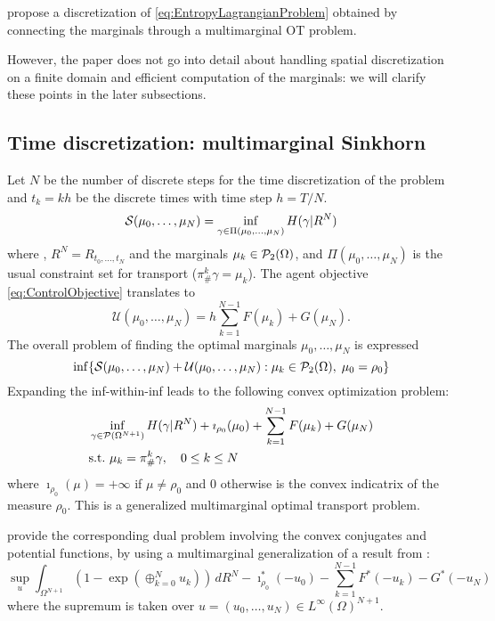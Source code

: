 \documentclass[../report.tex]{subfiles}
\begin{document}
\textcite{benamou2018entropy} propose a discretization of \eqref{eq:EntropyLagrangianProblem} obtained by connecting the marginals through a multimarginal OT problem.

However, the paper does not go into detail about handling spatial discretization on a finite domain and efficient computation of the marginals: we will clarify these points in the later subsections.


\subsection{Time discretization: multimarginal Sinkhorn}\label{sec:MMOT}

Let $N$ be the number of discrete steps for the time discretization of the problem and $t_k = kh$ be the discrete times with time step $h=T/N$.
\begin{equation}
	\mathcal{S}(\mu_0,\ldots,\mu_N) = 
	\inf_{\gamma \in \Pi(\mu_0, \ldots, \mu_N)} H(\gamma | R^N)
\end{equation}
where , $R^N = R_{t_0,\ldots,t_N}$ and the marginals $\mu_k \in \mathcal{P}_2(\Omega)$, and $\Pi(\mu_0, \ldots, \mu_N)$ is the usual constraint set for transport ($\pi^k_{\#}\gamma = \mu_k$). The agent objective \cref{eq:ControlObjective} translates to
\begin{equation}
	\mathcal{U}(\mu_0,\ldots,\mu_N) = h\sum_{k=1}^{N-1} F(\mu_k) + G(\mu_N).
\end{equation}
The overall problem of finding the optimal marginals $\mu_0,\ldots,\mu_N$ is expressed
\begin{equation}
	\inf \{
	\mathcal{S}(\mu_0, \ldots, \mu_N) + \mathcal{U}(\mu_0, \ldots, \mu_N) 
	: \mu_k \in \mathcal{P}_2(\Omega),\; \mu_0 = \rho_0
	\}
\end{equation}
Expanding the inf-within-inf leads to the following convex optimization problem:
\begin{equation}
\begin{aligned}
&\inf_{\gamma \in \mathcal{P}(\Omega^{N+1})}
H(\gamma | R^N) + \imath_{\rho_0}(\mu_0) + \sum_{k=1}^{N-1} F(\mu_k) + G(\mu_N) \\
&\mathrm{s.t.}\ \mu_k = \pi^k_\#\gamma,\quad 0\leq k\leq N
\end{aligned}
\end{equation}
where $\imath_{\rho_0}(\mu) = +\infty$ if $\mu\neq \rho_0$ and $0$ otherwise is the convex indicatrix of the measure $\rho_0$. This is a generalized multimarginal optimal transport problem.

\textcite{benamou2018entropy} provide the corresponding dual problem involving the convex conjugates and potential functions, by using a multimarginal generalization of a result from \textcite{chizat2016scaling}:
\begin{equation}\label{eq:TimeDiscreteDual}
\sup_u
\int_{\Omega^{N+1}} \left(1-\exp\left(\oplus_{k=0}^N u_k\right)\right) \,dR^N
-\imath_{\rho_0}^*(-u_0) - \sum_{k=1}^{N-1} F^*(-u_k) - G^*(-u_N)
\end{equation}
where the supremum is taken over $u = (u_0,\ldots,u_N) \in L^\infty(\Omega)^{N+1}$.
\end{document}
